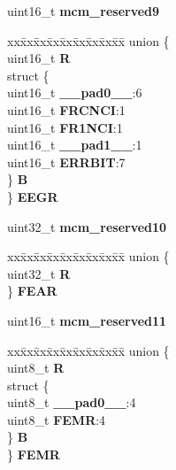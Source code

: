 \begin{DoxyCompactItemize}
\begin{tabbing}
\end{tabbing}\item 
\mbox{\label{structMCM__tag_afb86c39cc88a9329d9534d90bb8c4e46}} 
uint16\+\_\+t {\bfseries mcm\+\_\+reserved9}
\item 
\mbox{\label{structMCM__tag_a5d9f54a2043f105f9f96a00304089049}} 
\begin{tabbing}
xx\=xx\=xx\=xx\=xx\=xx\=xx\=xx\=xx\=\kill
union \{\\
\>uint16\_t {\bfseries R}\\
\>struct \{\\
\>\>uint16\_t {\bfseries \_\_pad0\_\_}:6\\
\>\>uint16\_t {\bfseries FRCNCI}:1\\
\>\>uint16\_t {\bfseries FR1NCI}:1\\
\>\>uint16\_t {\bfseries \_\_pad1\_\_}:1\\
\>\>uint16\_t {\bfseries ERRBIT}:7\\
\>\} {\bfseries B}\\
\} {\bfseries EEGR}\\

\end{tabbing}\item 
\mbox{\label{structMCM__tag_a2eb64072b94473f6a83b672ceba03d47}} 
uint32\+\_\+t {\bfseries mcm\+\_\+reserved10}
\item 
\mbox{\label{structMCM__tag_a70576ba1f29f14892c73efdac1b00464}} 
\begin{tabbing}
xx\=xx\=xx\=xx\=xx\=xx\=xx\=xx\=xx\=\kill
union \{\\
\>uint32\_t {\bfseries R}\\
\} {\bfseries FEAR}\\

\end{tabbing}\item 
\mbox{\label{structMCM__tag_a3cc1c16983e3b478216edf93b289e939}} 
uint16\+\_\+t {\bfseries mcm\+\_\+reserved11}
\item 
\mbox{\label{structMCM__tag_a5003ea30d8284ca517f923d27b8d2524}} 
\begin{tabbing}
xx\=xx\=xx\=xx\=xx\=xx\=xx\=xx\=xx\=\kill
union \{\\
\>uint8\_t {\bfseries R}\\
\>struct \{\\
\>\>uint8\_t {\bfseries \_\_pad0\_\_}:4\\
\>\>uint8\_t {\bfseries FEMR}:4\\
\>\} {\bfseries B}\\
\} {\bfseries FEMR}\\


\end{tabbing}
\end{DoxyCompactItemize}
